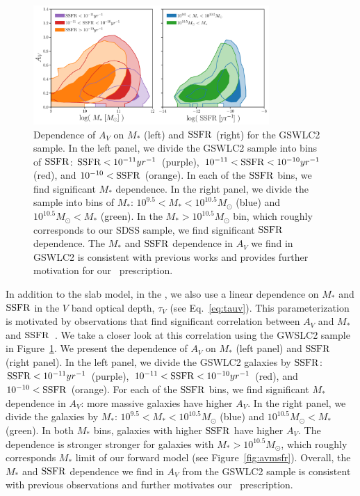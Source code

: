 \begin{figure}
\begin{center}
    \includegraphics[width=0.8\textwidth]{figs/gswlc_dep.pdf}
    \caption{\label{fig:dep}
    Dependence of $A_V$ on $M_*$ (left) and ${\rm SSFR}$ (right) for the
    \cite{salim2018} GSWLC2 sample.
    In the left panel, we divide the GSWLC2 sample into bins of ${\rm SSFR}$: 
    ${\rm SSFR} < 10^{-11}yr^{-1}$ (purple), 
    $10^{-11} < {\rm SSFR} < 10^{-10}yr^{-1}$ (red),
    and  $10^{-10} < {\rm SSFR}$ (orange). 
    In each of the ${\rm SSFR}$ bins, we find significant $M_*$ dependence. 
    In the right panel, we divide the sample into bins of $M_*$:  
    $10^{9.5} < M_* < 10^{10.5}M_\odot$ (blue) and $10^{10.5} M_\odot < M_*$ (green).
    In the $M_* > 10^{10.5}M_\odot$ bin, which roughly corresponds to our
    SDSS sample, we find significant ${\rm SSFR}$ dependence.
    The $M_*$ and ${\rm SSFR}$ dependence in $A_V$ we find in GSWLC2 is
    consistent with previous works and provides further motivation for our
    \eda~prescription.
    }
\end{center}
\end{figure}

In addition to the slab model, in the \eda, we also use a linear
dependence on $M_*$ and ${\rm SSFR}$ in the $V$ band optical depth,
$\tau_V$ (see Eq.~\ref{eq:tauv}).
This parameterization is motivated by observations that find significant
correlation between $A_V$ and $M_*$ and ${\rm SSFR}$~\citep[\eg~][]{garn2010, battisti2016, salim2020}. 
We take a closer look at this correlation using the GWSLC2 sample in
Figure~\ref{fig:dep}.
We present the dependence of $A_V$ on $M_*$ (left panel) and ${\rm SSFR}$ (right
panel). 
In the left panel, we divide the GSWLC2 galaxies by ${\rm SSFR}$: 
${\rm SSFR} < 10^{-11}yr^{-1}$ (purple), $10^{-11} < {\rm SSFR} < 10^{-10}yr^{-1}$
(red), and  $10^{-10} < {\rm SSFR}$ (orange). 
For each of the ${\rm SSFR}$ bins, we find significant $M_*$ dependence in
$A_V$: more massive galaxies have higher $A_V$.
In the right panel, we divide the galaxies by $M_*$: 
$10^{9.5} < M_* < 10^{10.5}M_\odot$ (blue) and $10^{10.5} M_\odot < M_*$
(green).
In both $M_*$ bins, galaxies with higher ${\rm SSFR}$ have higher $A_V$. 
The dependence is stronger stronger for galaxies with $M_* > 10^{10.5}M_\odot$, 
which roughly corresponds $M_*$ limit of our forward model (see
Figure~\ref{fig:avmsfr}). 
Overall, the $M_*$ and ${\rm SSFR}$ dependence we find in $A_V$ from the GSWLC2 sample is
consistent with previous observations and further motivates our
\eda~prescription.

